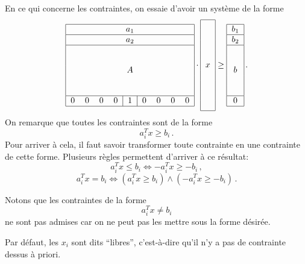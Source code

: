 	En ce qui concerne les contraintes,
	on essaie d'avoir un système de la forme
	\[
	\begin{tabular}{|ccccccccc|}
		\hline
		\multicolumn{9}{|c|}{$a_1$} \\
		\hline
		\multicolumn{9}{|c|}{$a_2$} \\
		\hline
		\multicolumn{9}{|c|}{\multirow{5}{*}{$A$}}
		\\
		&&&&&&&&\\
		&&&&&&&&\\
		&&&&&&&&\\
		&&&&&&&&\\
		\hline
		0 & 0 & 0 & 0 & \multicolumn{1}{|c|}{1} & 0 & 0 & 0 & 0 \\
		\hline
	\end{tabular}
	\cdot
	\begin{tabular}{|c|}
		\hline
		\multirow{9}{*}{$x$}
		\\
		\\
		\\
		\\
		\\
		\\
		\\
		\\
		\\
		\hline
	\end{tabular}
	\ge
	\begin{tabular}{|c|}
		\hline
		$b_1$ \\
		\hline
		$b_2$ \\
		\hline
		\multirow{5}{*}{$b$}
		\\
		\\
		\\
		\\
		\\
		\hline
		0 \\
		\hline
	\end{tabular}\,.
	\]
	On remarque que toutes les contraintes sont de la forme
	\[
	a_i^T x \ge b_i\,.
	\]
	Pour arriver à cela,
	il faut savoir transformer toute contrainte
	en une contrainte de cette forme.
	Plusieurs règles permettent d'arriver à ce résultat:
	\[
	a_i^T x \le b_i \iff -a_i^T x \ge -b_i\,,
	\]
	\[
	a_i^T x = b_i \iff \left(a_i^T x \ge b_i\right) \land \left(-a_i^T x \ge -b_i\right)\,.
	\]

	Notons que les contraintes de la forme
	\[
	a_i^T x \ne b_i
	\]
	ne sont pas admises car on ne peut pas les mettre sous la forme désirée.

	Par défaut, les $x_i$ sont dits ``libres'',
	c'est-à-dire qu'il n'y a pas de contrainte dessus à priori.

